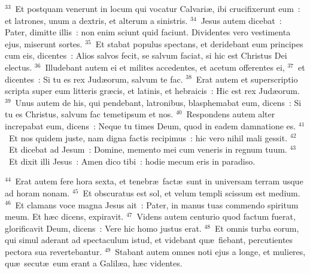 ${}^{33}$~Et postquam venerunt in locum qui vocatur Calvari\ae , ibi crucifixerunt eum~: et latrones, unum a dextris, et alterum a sinistris.
${}^{34}$~Jesus autem dicebat~: Pater, dimitte illis~: non enim sciunt quid faciunt. Dividentes vero vestimenta ejus, miserunt sortes.
${}^{35}$~Et stabat populus spectans, et deridebant eum principes cum eis, dicentes~: Alios salvos fecit, se salvum faciat, si hic est Christus Dei electus.
${}^{36}$~Illudebant autem ei et milites accedentes, et acetum offerentes ei,
${}^{37}$~et dicentes~: Si tu es rex Jud\ae orum, salvum te fac.
${}^{38}$~Erat autem et superscriptio scripta super eum litteris gr\ae cis, et latinis, et hebraicis~: Hic est rex Jud\ae orum.
${}^{39}$~Unus autem de his, qui pendebant, latronibus, blasphemabat eum, dicens~: Si tu es Christus, salvum fac temetipsum et nos.
${}^{40}$~Respondens autem alter increpabat eum, dicens~: Neque tu times Deum, quod in eadem damnatione es.
${}^{41}$~Et nos quidem juste, nam digna factis recipimus~: hic vero nihil mali gessit.
${}^{42}$~Et dicebat ad Jesum~: Domine, memento mei cum veneris in regnum tuum.
${}^{43}$~Et dixit illi Jesus~: Amen dico tibi~: hodie mecum eris in paradiso.


${}^{44}$~Erat autem fere hora sexta, et tenebr\ae\ fact\ae\ sunt in universam terram usque ad horam nonam.
${}^{45}$~Et obscuratus est sol, et velum templi scissum est medium.
${}^{46}$~Et clamans voce magna Jesus ait~: Pater, in manus tuas commendo spiritum meum. Et h\ae c dicens, expiravit.
${}^{47}$~Videns autem centurio quod factum fuerat, glorificavit Deum, dicens~: Vere hic homo justus erat.
${}^{48}$~Et omnis turba eorum, qui simul aderant ad spectaculum istud, et videbant qu\ae\ fiebant, percutientes pectora sua revertebantur.
${}^{49}$~Stabant autem omnes noti ejus a longe, et mulieres, qu\ae\ secut\ae\ eum erant a Galil\ae a, h\ae c videntes.



